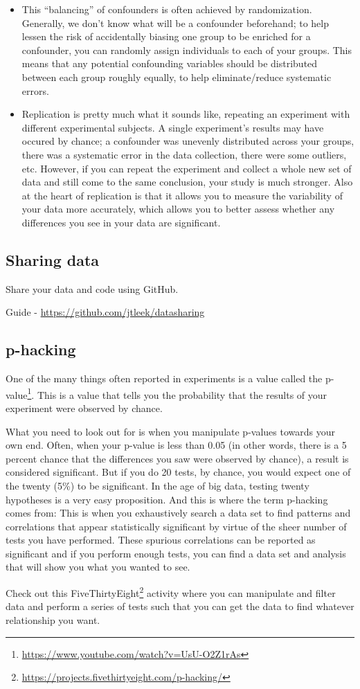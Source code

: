 \documentclass[11pt,fancy]{elegantbook}
\begin{document}
\begin{itemize}
    \item This “balancing” of confounders is often achieved by randomization. Generally, we don't know what will be a confounder beforehand; to help lessen the risk of accidentally biasing one group to be enriched for a confounder, you can randomly assign individuals to each of your groups. This means that any potential confounding variables should be distributed between each group roughly equally, to help eliminate/reduce systematic errors.
    \item Replication is pretty much what it sounds like, repeating an experiment with different experimental subjects. A single experiment's results may have occured by chance; a confounder was unevenly distributed across your groups, there was a systematic error in the data collection, there were some outliers, etc. However, if you can repeat the experiment and collect a whole new set of data and still come to the same conclusion, your study is much stronger. Also at the heart of replication is that it allows you to measure the variability of your data more accurately, which allows you to better assess whether any differences you see in your data are significant.
\end{itemize}

\subsection{Sharing data}
Share your data and code using GitHub.
\par Guide - \url{https://github.com/jtleek/datasharing}

\subsection{p-hacking}
One of the many things often reported in experiments is a value called the p-value\footnote{\url{https://www.youtube.com/watch?v=UsU-O2Z1rAs}}. This is a value that tells you the probability that the results of your experiment were observed by chance.
\par What you need to look out for is when you manipulate p-values towards your own end. Often, when your p-value is less than 0.05 (in other words, there is a 5 percent chance that the differences you saw were observed by chance), a result is considered significant. But if you do 20 tests, by chance, you would expect one of the twenty (5\%) to be significant. In the age of big data, testing twenty hypotheses is a very easy proposition. And this is where the term p-hacking comes from: This is when you exhaustively search a data set to find patterns and correlations that appear statistically significant by virtue of the sheer number of tests you have performed. These spurious correlations can be reported as significant and if you perform enough tests, you can find a data set and analysis that will show you what you wanted to see.
\par Check out this FiveThirtyEight\footnote{\url{https://projects.fivethirtyeight.com/p-hacking/}} activity where you can manipulate and filter data and perform a series of tests such that you can get the data to find whatever relationship you want.
\end{document}
